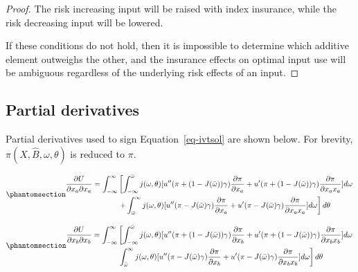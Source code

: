 \documentclass[
  letterpaper,
  DIV=11,
  numbers=noendperiod]{scrartcl}
\theoremstyle{plain}
\theoremstyle{plain}
\theoremstyle{remark}
\begin{document}
\begin{proof}
The risk increasing input will be raised with index insurance, while the
risk decreasing input will be lowered.

If these conditions do not hold, then it is impossible to determine
which additive element outweighs the other, and the insurance effects on
optimal input use will be ambiguous regardless of the underlying risk
effects of an input.
\end{proof}

\subsection{Partial derivatives}\label{sec-partial}

Partial derivatives used to sign Equation~\ref{eq-ivtsol} are shown
below. For brevity, \(\pi(X,\hat B,\omega,\theta)\) is reduced to
\(\pi\).

\begin{equation}\phantomsection\label{eq-kk}{
\begin{aligned}
\frac{\partial U}{\partial x_a \partial x_a}=\int^\infty_{-\infty}&\left[ \int^{\bar \omega}_{-\infty}j(\omega,\theta)[u''(\pi+(1-J(\bar \omega))\gamma)\frac{\partial\pi}{\partial x_a}+u'(\pi+(1-J(\bar \omega))\gamma)\frac{\partial \pi}{\partial x_a x_a}]d\omega \right. \\
&\left. +\int^\infty_{\bar \omega}j(\omega,\theta)[u''(\pi-J(\bar \omega)\gamma)\frac{\partial\pi}{\partial x_a}+u'(\pi-J(\bar \omega)\gamma)\frac{\partial \pi}{\partial x_a x_a}]d\omega\right]d\theta
\end{aligned}
}\end{equation}

\begin{equation}\phantomsection\label{eq-ll}{
\begin{aligned}
\frac{\partial U}{\partial x_b \partial x_b}=\int^\infty_{-\infty}&\left[ \int^{\bar \omega}_{-\infty}j(\omega,\theta)[u''(\pi+(1-J(\bar \omega))\gamma)\frac{\partial\pi}{\partial x_b}+u'(\pi+(1-J(\bar \omega))\gamma)\frac{\partial \pi}{\partial x_b x_b}]d\omega \right. \\
&\left.\int^\infty_{\bar \omega}j(\omega,\theta)[u''(\pi-J(\bar \omega)\gamma)\frac{\partial\pi}{\partial x_b}+u'(\pi-J(\bar \omega)\gamma)\frac{\partial \pi}{\partial x_b x_b}]d\omega\right]d\theta
\end{aligned}
}\end{equation}
\end{document}
